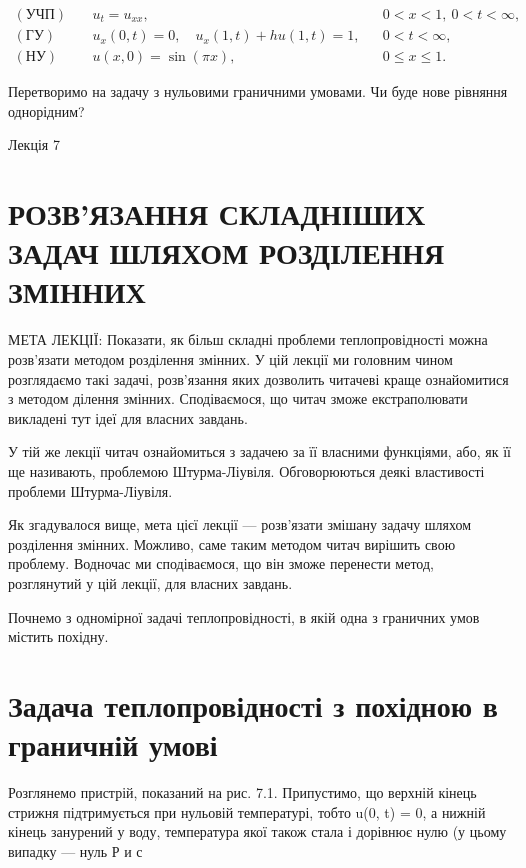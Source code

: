 \documentclass[
  ukrainian,
]{article}
\begin{document}
\[
\begin{aligned}
(\text{УЧП})\quad & u_t = u_{xx}, && 0 < x < 1,\ 0 < t < \infty, \\
(\text{ГУ})\quad & u_x(0,t) = 0,\quad u_x(1,t) + h u(1,t) = 1, && 0 < t < \infty, \\
(\text{НУ})\quad & u(x,0) = \sin(\pi x), && 0 \leqslant x \leqslant 1.
\end{aligned}
\]

Перетворимо на задачу з нульовими граничними умовами. Чи буде нове
рівняння однорідним?

Лекція 7

\section{РОЗВ'ЯЗАННЯ СКЛАДНІШИХ ЗАДАЧ ШЛЯХОМ РОЗДІЛЕННЯ
ЗМІННИХ}\label{ux440ux43eux437ux432ux44fux437ux430ux43dux43dux44f-ux441ux43aux43bux430ux434ux43dux456ux448ux438ux445-ux437ux430ux434ux430ux447-ux448ux43bux44fux445ux43eux43c-ux440ux43eux437ux434ux456ux43bux435ux43dux43dux44f-ux437ux43cux456ux43dux43dux438ux445}

МЕТА ЛЕКЦІЇ: Показати, як більш складні проблеми теплопровідності можна
розв'язати методом розділення змінних. У цій лекції ми головним чином
розглядаємо такі задачі, розв'язання яких дозволить читачеві краще
ознайомитися з методом ділення змінних. Сподіваємося, що читач зможе
екстраполювати викладені тут ідеї для власних завдань.

У тій же лекції читач ознайомиться з задачею за її власними функціями,
або, як її ще називають, проблемою Штурма-Ліувіля. Обговорюються деякі
властивості проблеми Штурма-Ліувіля.

Як згадувалося вище, мета цієї лекції --- розв'язати змішану задачу
шляхом розділення змінних. Можливо, саме таким методом читач вирішить
свою проблему. Водночас ми сподіваємося, що він зможе перенести метод,
розглянутий у цій лекції, для власних завдань.

Почнемо з одномірної задачі теплопровідності, в якій одна з граничних
умов містить похідну.

\section{Задача теплопровідності з похідною в граничній
умові}\label{ux437ux430ux434ux430ux447ux430-ux442ux435ux43fux43bux43eux43fux440ux43eux432ux456ux434ux43dux43eux441ux442ux456-ux437-ux43fux43eux445ux456ux434ux43dux43eux44e-ux432-ux433ux440ux430ux43dux438ux447ux43dux456ux439-ux443ux43cux43eux432ux456}

Розглянемо пристрій, показаний на рис. 7.1. Припустимо, що верхній
кінець стрижня підтримується при нульовій температурі, тобто u(0, t) =
0, а нижній кінець занурений у воду, температура якої також стала і
дорівнює нулю (у цьому випадку --- нуль Р и с
\end{document}
